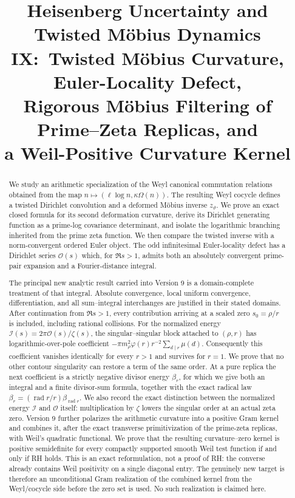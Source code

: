 \documentclass[11pt]{amsart}
\title[Heisenberg Uncertainty and M\"obius Dynamics IX]{
Heisenberg Uncertainty and Twisted M\"obius Dynamics IX:\
Twisted M\"obius Curvature, Euler-Locality Defect,\\
Rigorous M\"obius Filtering of Prime--Zeta Replicas, and\\
a Weil-Positive Curvature Kernel
}
\author{}
\date{}
\numberwithin{equation}{section}
\theoremstyle{plain}
\theoremstyle{definition}
\theoremstyle{remark}
\begin{document}
\begin{abstract}
We study an arithmetic specialization of the Weyl canonical commutation
relations obtained from the map
\(n\mapsto (\ell\log n,\kappa\Omega(n))\).  The resulting Weyl cocycle
defines a twisted Dirichlet convolution and a deformed M\"obius inverse
\(z_\vartheta\).  We prove an exact closed formula for its second deformation
curvature, derive its Dirichlet generating function as a prime-log covariance
determinant, and isolate the logarithmic branching inherited from the prime
zeta function.  We then compare the twisted inverse with a norm-convergent
ordered Euler object.  The odd infinitesimal Euler-locality defect has a
Dirichlet series \(\mathcal O(s)\) which, for \(\Re s>1\), admits both an
absolutely convergent prime-pair expansion and a Fourier-distance integral.

The principal new analytic result carried into Version 9 is a domain-complete treatment
of that integral.  Absolute convergence, local uniform convergence,
differentiation, and all sum--integral interchanges are justified in their
stated domains.  After continuation from \(\Re s>1\), every contribution
arriving at a scaled zero \(s_0=\rho/r\) is included, including rational
collisions.  For the normalized energy
\(\mathcal I(s)=2\pi\mathcal O(s)/\zeta(s)\), the singular--singular block attached to \((\rho,r)\) has
logarithmic-over-pole coefficient
\(-\pi m_\rho^2\varphi(r)r^{-2}\sum_{d\mid r}\mu(d)\).
Consequently this coefficient vanishes identically for every \(r>1\) and
survives for \(r=1\).  We prove that no other contour singularity can restore
a term of the same order.  At a pure replica the next coefficient is a
strictly negative divisor energy \(\beta_r\), for which we give both an
integral and a finite divisor-sum formula, together with the exact radical law
\(\beta_r=(\operatorname{rad}r/r)\beta_{\operatorname{rad}r}\).  We also
record the exact distinction between the normalized energy \(\mathcal I\) and
\(\mathcal O\) itself: multiplication by \(\zeta\) lowers the singular order
at an actual zeta zero.  Version 9 further polarizes the arithmetic curvature
into a positive Gram kernel and combines it, after the exact transverse
primitivization of the prime-zeta replicas, with Weil's quadratic functional.
We prove that the resulting curvature--zero kernel is positive semidefinite
for every compactly supported smooth Weil test function if and only if RH
holds.  This is an exact reformulation, not a proof of RH: the converse already
contains Weil positivity on a single diagonal entry.  The genuinely new target
is therefore an unconditional Gram realization of the combined kernel from
the Weyl/cocycle side before the zero set is used.  No such realization is
claimed here.
\end{abstract}
\end{document}
